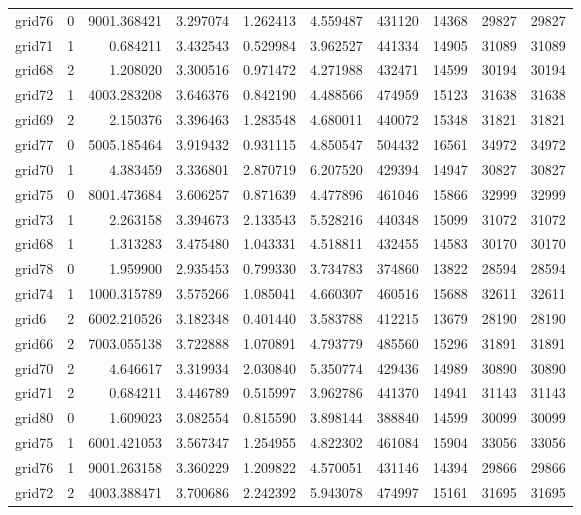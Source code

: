 \documentclass[../../../thesis.tex]{subfiles}
\begin{document}
\begin{longtable}{|l|r|r|r|r|r|r|r|r|r|}
grid76 & 0 & 9001.368421 & 3.297074 & 1.262413 & 4.559487 & 431120 & 14368 & 29827 & 29827 \\
grid71 & 1 & 0.684211 & 3.432543 & 0.529984 & 3.962527 & 441334 & 14905 & 31089 & 31089 \\
grid68 & 2 & 1.208020 & 3.300516 & 0.971472 & 4.271988 & 432471 & 14599 & 30194 & 30194 \\
grid72 & 1 & 4003.283208 & 3.646376 & 0.842190 & 4.488566 & 474959 & 15123 & 31638 & 31638 \\
grid69 & 2 & 2.150376 & 3.396463 & 1.283548 & 4.680011 & 440072 & 15348 & 31821 & 31821 \\
grid77 & 0 & 5005.185464 & 3.919432 & 0.931115 & 4.850547 & 504432 & 16561 & 34972 & 34972 \\
grid70 & 1 & 4.383459 & 3.336801 & 2.870719 & 6.207520 & 429394 & 14947 & 30827 & 30827 \\
grid75 & 0 & 8001.473684 & 3.606257 & 0.871639 & 4.477896 & 461046 & 15866 & 32999 & 32999 \\
grid73 & 1 & 2.263158 & 3.394673 & 2.133543 & 5.528216 & 440348 & 15099 & 31072 & 31072 \\
grid68 & 1 & 1.313283 & 3.475480 & 1.043331 & 4.518811 & 432455 & 14583 & 30170 & 30170 \\
grid78 & 0 & 1.959900 & 2.935453 & 0.799330 & 3.734783 & 374860 & 13822 & 28594 & 28594 \\
grid74 & 1 & 1000.315789 & 3.575266 & 1.085041 & 4.660307 & 460516 & 15688 & 32611 & 32611 \\
grid6 & 2 & 6002.210526 & 3.182348 & 0.401440 & 3.583788 & 412215 & 13679 & 28190 & 28190 \\
grid66 & 2 & 7003.055138 & 3.722888 & 1.070891 & 4.793779 & 485560 & 15296 & 31891 & 31891 \\
grid70 & 2 & 4.646617 & 3.319934 & 2.030840 & 5.350774 & 429436 & 14989 & 30890 & 30890 \\
grid71 & 2 & 0.684211 & 3.446789 & 0.515997 & 3.962786 & 441370 & 14941 & 31143 & 31143 \\
grid80 & 0 & 1.609023 & 3.082554 & 0.815590 & 3.898144 & 388840 & 14599 & 30099 & 30099 \\
grid75 & 1 & 6001.421053 & 3.567347 & 1.254955 & 4.822302 & 461084 & 15904 & 33056 & 33056 \\
grid76 & 1 & 9001.263158 & 3.360229 & 1.209822 & 4.570051 & 431146 & 14394 & 29866 & 29866 \\
grid72 & 2 & 4003.388471 & 3.700686 & 2.242392 & 5.943078 & 474997 & 15161 & 31695 & 31695 \\

\end{longtable}
\end{document}
